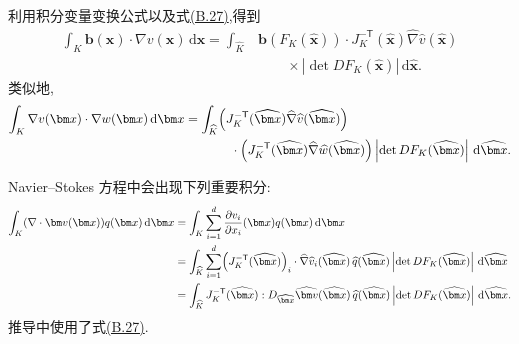 \begin{note}[含梯度的积分]\label{note:appendix-b-60}
利用积分变量变换公式以及式\hyperref[eq:appendix-b-27]{(B.27)},得到
\begin{equation}\label{eq:appendix-b-29}
\begin{aligned}
 \int_K \bm b(\bm x)\cdot\nabla v(\bm x)\,\mathrm d\bm x
 =\int_{\widehat K}&\bm b(F_K(\widehat{\bm x}))\cdot
 J_K^{-\mathsf T}(\widehat{\bm x})
 \widehat\nabla\widehat v(\widehat{\bm x})\\[-2pt]
 &\qquad\times
 \left|\det DF_K(\widehat{\bm x})\right|
 \,\mathrm d\widehat{\bm x}.
\end{aligned}
\end{equation}
类似地,
\begin{equation}\label{eq:appendix-b-30}
\begin{aligned}
 \int_K \nabla v(\bm x)\cdot\nabla w(\bm x)\,\mathrm d\bm x
 =\int_{\widehat K}&\Bigl(
   J_K^{-\mathsf T}(\widehat{\bm x})
   \widehat\nabla\widehat v(\widehat{\bm x})\Bigr)\\
 &\quad\cdot\Bigl(
   J_K^{-\mathsf T}(\widehat{\bm x})
   \widehat\nabla\widehat w(\widehat{\bm x})\Bigr)
   \left|\det DF_K(\widehat{\bm x})\right|
   \,\mathrm d\widehat{\bm x}.
\end{aligned}
\end{equation}
\end{note}

\begin{note}[含散度的积分]\label{note:appendix-b-61}
Navier--Stokes 方程中会出现下列重要积分:
\begin{equation}\label{eq:appendix-b-31}
\begin{aligned}
 \int_K(\nabla\cdot\bm v(\bm x))q(\bm x)\,\mathrm d\bm x
 &=\int_K\sum_{i=1}^d
   \frac{\partial v_i}{\partial x_i}(\bm x)q(\bm x)\,
   \mathrm d\bm x\\
 &=\int_{\widehat K}\sum_{i=1}^d
   \Bigl(J_K^{-\mathsf T}(\widehat{\bm x})\Bigr)_i
   \cdot\widehat\nabla\widehat v_i(\widehat{\bm x})
   \,\widehat q(\widehat{\bm x})
   \left|\det DF_K(\widehat{\bm x})\right|
   \,\mathrm d\widehat{\bm x}\\
 &=\int_{\widehat K}
   J_K^{-\mathsf T}(\widehat{\bm x})
   :D_{\widehat{\bm x}}\widehat{\bm v}(\widehat{\bm x})
   \,\widehat q(\widehat{\bm x})
   \left|\det DF_K(\widehat{\bm x})\right|
   \,\mathrm d\widehat{\bm x}.
\end{aligned}
\end{equation}
推导中使用了式\hyperref[eq:appendix-b-27]{(B.27)}.
\end{note}

